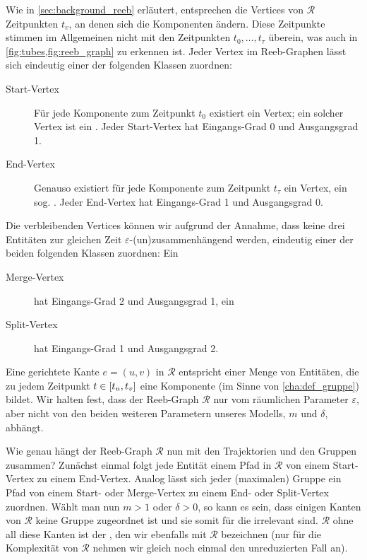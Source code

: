 Wie in \cref{sec:background_reeb} erläutert, entsprechen die Vertices von $\mathcal{R}$ Zeitpunkten $t_v$, an denen sich die Komponenten ändern.
Diese Zeitpunkte stimmen im Allgemeinen nicht mit den Zeitpunkten $t_0, \ldots, t_\tau$ überein, was auch in \cref{fig:tubes,fig:reeb_graph} zu erkennen ist.
Jeder Vertex im Reeb-Graphen lässt sich eindeutig einer der folgenden Klassen zuordnen:
\begin{description}
	\item[Start-Vertex] Für jede Komponente zum Zeitpunkt $t_0$ existiert ein Vertex; ein solcher Vertex ist ein .
	Jeder Start-Vertex hat Eingangs-Grad 0 und Ausgangsgrad 1.
	\item[End-Vertex] Genauso existiert für jede Komponente zum Zeitpunkt $t_\tau$ ein Vertex, ein sog. .
	Jeder End-Vertex hat Eingangs-Grad 1 und Ausgangsgrad 0.
\end{description}
Die verbleibenden Vertices können wir aufgrund der Annahme, dass keine drei Entitäten zur gleichen Zeit $\varepsilon$-(un)zusammenhängend werden, eindeutig einer der beiden folgenden Klassen zuordnen: Ein
\begin{description}
	\item[Merge-Vertex] hat Eingangs-Grad 2 und Ausgangsgrad 1, ein
	\item[Split-Vertex] hat Eingangs-Grad 1 und Ausgangsgrad 2.
\end{description}
Eine gerichtete Kante $e=(u,v)$ in $\mathcal{R}$ entspricht einer Menge von Entitäten, die zu jedem Zeitpunkt $t \in \benbrace*{t_u,t_v}$ eine Komponente (im Sinne von \cref{cha:def_gruppe}) bildet.
Wir halten fest, dass der Reeb-Graph $\mathcal{R}$ nur vom räumlichen Parameter $\varepsilon$, aber nicht von den beiden weiteren Parametern unseres Modells, $m$ und $\delta$, abhängt.

Wie genau hängt der Reeb-Graph $\mathcal{R}$ nun mit den Trajektorien und den Gruppen zusammen?
Zunächst einmal folgt jede Entität einem Pfad in $\mathcal{R}$ von einem Start-Vertex zu einem End-Vertex.
Analog lässt sich jeder (maximalen) Gruppe ein Pfad von einem Start- oder Merge-Vertex zu einem End- oder Split-Vertex zuordnen.
Wählt man nun $m > 1$ oder $\delta > 0$, so kann es sein, dass einigen Kanten von $\mathcal{R}$ keine Gruppe zugeordnet ist und sie somit für die \GrpStruktur irrelevant sind.
$\mathcal{R}$ ohne all diese Kanten ist der , den wir ebenfalls mit $\mathcal{R}$ bezeichnen (nur für die Komplexität von $\mathcal{R}$ nehmen wir gleich noch einmal den unreduzierten Fall an).


